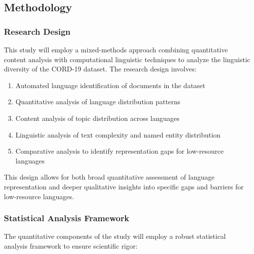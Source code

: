 \documentclass[
]{article}
\providecommand{\tightlist}{%
  \setlength{\itemsep}{0pt}\setlength{\parskip}{0pt}}\usepackage{longtable,booktabs,array}
\begin{document}
\subsection{Methodology}\label{methodology}

\subsubsection{Research Design}\label{research-design}

This study will employ a mixed-methods approach combining quantitative
content analysis with computational linguistic techniques to analyze the
linguistic diversity of the CORD-19 dataset. The research design
involves:

\begin{enumerate}
\def\labelenumi{\arabic{enumi}.}
\tightlist
\item
  Automated language identification of documents in the dataset
\item
  Quantitative analysis of language distribution patterns
\item
  Content analysis of topic distribution across languages
\item
  Linguistic analysis of text complexity and named entity distribution
\item
  Comparative analysis to identify representation gaps for low-resource
  languages
\end{enumerate}

This design allows for both broad quantitative assessment of language
representation and deeper qualitative insights into specific gaps and
barriers for low-resource languages.

\subsubsection{Statistical Analysis
Framework}\label{statistical-analysis-framework}

The quantitative components of the study will employ a robust
statistical analysis framework to ensure scientific rigor:
\end{document}
